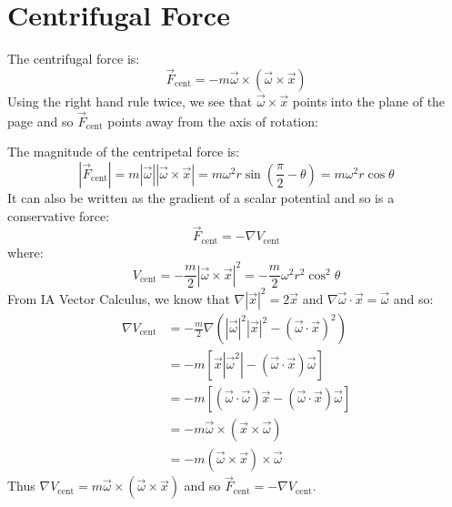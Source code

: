 \documentclass[../main.tex]{subfiles}
\begin{document}
\section{Centrifugal Force}
The centrifugal force is:
\[
  \vec{F}_{\text{cent}} = -m \vec{\omega} \times (\vec{\omega} \times \vec{x})
\]
Using the right hand rule twice, we see that $\vec{\omega} \times \vec{x}$ points into the plane of the page and so $\vec{F}_{\text{cent}}$ points away from the axis of rotation:
\begin{center}
\end{center}
The magnitude of the centripetal force is:
\[
  |\vec{F}_{\text{cent}}| = m|\vec{\omega}||\vec{\omega} \times \vec{x}| = m\omega^2 r \sin\left(\frac{\pi}{2} - \theta\right) = m \omega^2 r \cos \theta
\]
It can also be written as the gradient of a scalar potential and so is a conservative force:
\[
  \vec{F}_{\text{cent}} = - \nabla V_{\text{cent}}
\]
where:
\[
  V_{\text{cent}} = - \frac{m}{2} |\vec{\omega} \times \vec{x}|^2 = - \frac{m}{2}\omega^2 r^2 \cos^2 \theta
\]
From IA Vector Calculus, we know that $\nabla |\vec{x}|^2 = 2 \vec{x}$ and $\nabla \vec{\omega} \cdot \vec{x} = \vec{\omega}$ and so:
\begin{align*}
  \nabla V_{\text{cent}} &= -\frac{m}{2} \nabla (|\vec{\omega}|^2 |\vec{x}|^2 - (\vec{\omega} \cdot \vec{x})^2) \\
                         &= -m [\vec{x}|\vec{\omega}^2| - (\vec{\omega} \cdot \vec{x}) \vec{\omega}] \\
                         &= -m[(\vec{\omega} \cdot \vec{\omega}) \vec{x} - (\vec{\omega} \cdot \vec{x}) \vec{\omega}] \\
                         &= -m\vec{\omega} \times (\vec{x} \times \vec{\omega}) \\
                         &= -m (\vec{\omega} \times \vec{x}) \times \vec{\omega}
\end{align*}
Thus $\nabla V_{\text{cent}} = m \vec{\omega} \times (\vec{\omega} \times \vec{x})$ and so $\vec{F}_{\text{cent}} = -\nabla V_{\text{cent}}$.
\end{document}
